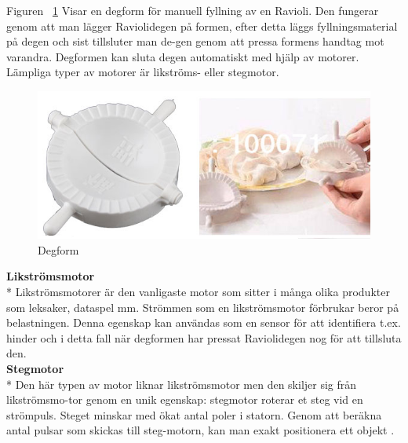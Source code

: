 Figuren  ~\ref{degform} Visar en degform för manuell fyllning av en Ravioli. Den fungerar genom att man lägger Raviolidegen på formen, efter detta läggs fyllningsmaterial på degen och sist tillsluter man de-gen genom att pressa formens handtag mot varandra. Degformen kan sluta degen automatiskt med hjälp av motorer. Lämpliga typer av motorer  är likströms- eller stegmotor.
\begin{figure}[h]
	\begin{center}
		\includegraphics[scale=0.75]{images/ravioli_mould_trimed_1.jpg}
		\caption{Degform}
		\label{degform}
	\end{center}
\end{figure}


\textbf{Likströmsmotor}\\*
Likströmsmotorer är den vanligaste motor som sitter i många olika produkter som leksaker, dataspel mm\cite{likstromsmotor}. Strömmen som en likströmsmotor förbrukar beror på belastningen. Denna egenskap kan användas som en sensor för att identifiera t.ex. hinder och i detta fall när degformen har pressat Raviolidegen nog för att tillsluta den.\\

\textbf{Stegmotor}\\*
Den här typen av motor liknar likströmsmotor men den skiljer sig från likströmsmo-tor genom en unik egenskap: stegmotor roterar et steg vid en strömpuls. Steget minskar med ökat antal poler i statorn. Genom att beräkna antal pulsar som skickas till steg-motorn, kan man exakt positionera ett objekt \cite{stegmotor}.
